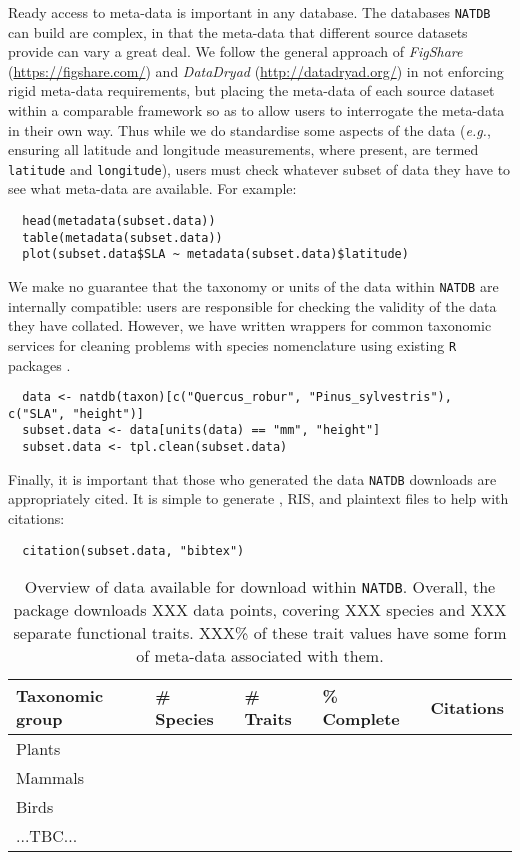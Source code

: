 \documentclass[12pt]{report}
\newcommand{\R}{\texttt{R}\xspace}
\newcommand{\natdb}{\texttt{NATDB}\xspace}
\begin{document}
Ready access to meta-data is important in any database. The databases
\natdb can build are complex, in that the meta-data that different
source datasets provide can vary a great deal. We follow the general
approach of \emph{FigShare} (\url{https://figshare.com/}) and
\emph{DataDryad} (\url{http://datadryad.org/}) in not enforcing rigid
meta-data requirements, but placing the meta-data of each source
dataset within a comparable framework so as to allow users to
interrogate the meta-data in their own way. Thus while we do
standardise some aspects of the data (\emph{e.g.}, ensuring all
latitude and longitude measurements, where present, are termed
\texttt{latitude} and \texttt{longitude}), users must check whatever
subset of data they have to see what meta-data are available. For
example:

\begin{verbatim}
  head(metadata(subset.data))
  table(metadata(subset.data))
  plot(subset.data$SLA ~ metadata(subset.data)$latitude)
\end{verbatim}

We make no guarantee that the taxonomy or units of the data within
\natdb are internally compatible: users are responsible for checking
the validity of the data they have collated. However, we have written
wrappers for common taxonomic services for cleaning problems with
species nomenclature using existing \R packages
\autocite[\texttt{Taxonstand} and others?]{Cayuela2012}.

\begin{verbatim}
  data <- natdb(taxon)[c("Quercus_robur", "Pinus_sylvestris"), c("SLA", "height")]
  subset.data <- data[units(data) == "mm", "height"]
  subset.data <- tpl.clean(subset.data)
\end{verbatim}

Finally, it is important that those who generated the data \natdb
downloads are appropriately cited. It is simple to generate
, RIS, and plaintext files to help with citations:

\begin{verbatim}
  citation(subset.data, "bibtex")
\end{verbatim}


\begin{table}
  \begin{tabular}{lllll}
    Taxonomic group & \# Species & \# Traits & \% Complete & Citations \\ \hline
    Plants & & & \textcite{Wright2004}\\
    Mammals & & & \textcite{Jones2009,Wilman2014}\\
    Birds & & & \textcite{Wilman2014}\\
    ...TBC... \\ \hline
  \end{tabular}
  \caption{Overview of data available for download within
    \natdb. Overall, the package downloads XXX data points, covering
    XXX species and XXX separate functional traits. XXX\% of these
    trait values have some form of meta-data associated with them.}
  \label{overview}
\end{table}
\end{document}
